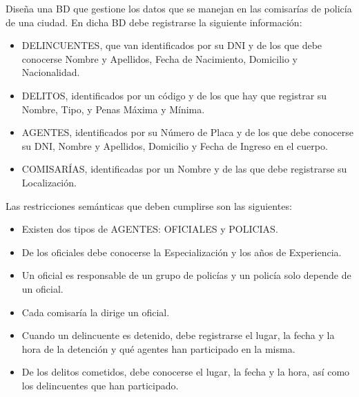 \begin{ejercicio} \label{ej:12}
    Diseña una BD que gestione los datos que se manejan en las comisarías de policía de una ciudad. En dicha BD
    debe registrarse la siguiente información:
    \begin{itemize}
        \item DELINCUENTES, que van identificados por su DNI y de los que debe conocerse Nombre y Apellidos, Fecha
        de Nacimiento, Domicilio y Nacionalidad.
        \item DELITOS, identificados por un código y de los que hay que registrar su Nombre, Tipo, y Penas Máxima y
        Mínima.
        \item AGENTES, identificados por su Número de Placa y de los que debe conocerse su DNI, Nombre y Apellidos,
        Domicilio y Fecha de Ingreso en el cuerpo.
        \item COMISARÍAS, identificadas por un Nombre y de las que debe registrarse su Localización.
    \end{itemize}
    Las restricciones semánticas que deben cumplirse son las siguientes:
    \begin{itemize}
        \item Existen dos tipos de AGENTES: OFICIALES y POLICIAS.
        \item De los oficiales debe conocerse la Especialización y los años de Experiencia.
        \item Un oficial es responsable de un grupo de policías y un policía solo depende de un oficial.
        \item Cada comisaría la dirige un oficial.
        \item Cuando un delincuente es detenido, debe registrarse el lugar, la fecha y la hora de la detención y qué
        agentes han participado en la misma.
        \item De los delitos cometidos, debe conocerse el lugar, la fecha y la hora, así como los delincuentes que han
        participado.
    \end{itemize}
\end{ejercicio}

